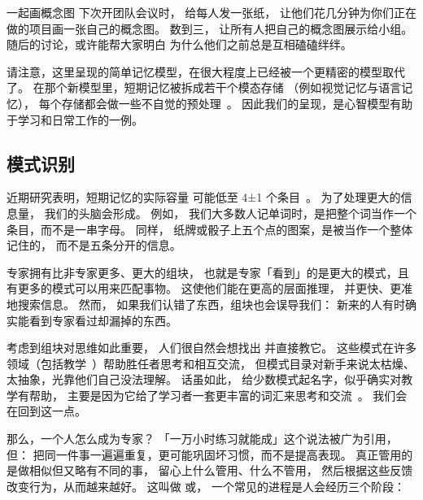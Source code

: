 
\begin{aside}{一起画概念图}
  下次开团队会议时，
  给每人发一张纸，
  让他们花几分钟为你们正在做的项目画一张自己的概念图。
  数到三，
  让所有人把自己的概念图展示给小组。
  随后的讨论，或许能帮大家明白
  为什么他们之前总是互相磕磕绊绊。
\end{aside}

请注意，这里呈现的简单记忆模型，在很大程度上已经被一个更精密的模型取代了。
在那个新模型里，短期记忆被拆成若干个模态存储
（例如视觉记忆与语言记忆），
每个存储都会做一些不自觉的预处理~\cite{Mill2016a}。
因此我们的呈现，是心智模型有助于学习和日常工作的一例。

\subsection*{模式识别}

近期研究表明，短期记忆的实际容量
可能低至 4±1 个条目~\cite{Dida2016}。
为了处理更大的信息量，
我们的头脑会形成。
例如，
我们大多数人记单词时，是把整个词当作一个条目，而不是一串字母。
同样，
纸牌或骰子上五个点的图案，是被当作一个整体记住的，
而不是五条分开的信息。

专家拥有比非专家更多、更大的组块，
也就是专家「看到」的是更大的模式，且有更多的模式可以用来匹配事物。
这使他们能在更高的层面推理，
并更快、更准地搜索信息。
然而，
如果我们认错了东西，组块也会误导我们：
新来的人有时确实能看到专家看过却漏掉的东西。

考虑到组块对思维如此重要，
人们很自然会想找出
并直接教它。
这些模式在许多领域（包括教学~\cite{Berg2012}）帮助胜任者思考和相互交流，
但模式目录对新手来说太枯燥、太抽象，光靠他们自己没法理解。
话虽如此，
给少数模式起名字，似乎确实对教学有帮助，
主要是因为它给了学习者一套更丰富的词汇来思考和交流~\cite{Kuit2004,Byck2005,Saja2006}。
我们会在回到这一点。


那么，一个人怎么成为专家？
「一万小时练习就能成」这个说法被广为引用，
但：
把同一件事一遍遍重复，更可能巩固坏习惯，而不是提高表现。
真正管用的是做相似但又略有不同的事，
留心上什么管用、什么不管用，
然后根据这些反馈改变行为，从而越来越好。
这叫做
或，
一个常见的进程是人会经历三个阶段：

